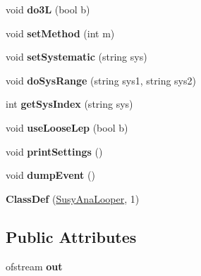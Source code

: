 \begin{DoxyCompactItemize}
\item 
\hypertarget{classSusyAnaLooper_ac052d906c31f6143c6c4a2cfec9c166d}{
void {\bfseries do3L} (bool b)}
\label{classSusyAnaLooper_ac052d906c31f6143c6c4a2cfec9c166d}

\item 
\hypertarget{classSusyAnaLooper_adb001d7df8be127ce626abb12f2d3735}{
void {\bfseries setMethod} (int m)}
\label{classSusyAnaLooper_adb001d7df8be127ce626abb12f2d3735}

\item 
\hypertarget{classSusyAnaLooper_aa65a103d4ad98c201fce242b612adba2}{
void {\bfseries setSystematic} (string sys)}
\label{classSusyAnaLooper_aa65a103d4ad98c201fce242b612adba2}

\item 
\hypertarget{classSusyAnaLooper_a2828279e51a904222ecfbcb9cfa51015}{
void {\bfseries doSysRange} (string sys1, string sys2)}
\label{classSusyAnaLooper_a2828279e51a904222ecfbcb9cfa51015}

\item 
\hypertarget{classSusyAnaLooper_a435f3dd21a498e30111946be71d75019}{
int {\bfseries getSysIndex} (string sys)}
\label{classSusyAnaLooper_a435f3dd21a498e30111946be71d75019}

\item 
\hypertarget{classSusyAnaLooper_aa1e947b5f0a2ac1022b81b5cfadfdc49}{
void {\bfseries useLooseLep} (bool b)}
\label{classSusyAnaLooper_aa1e947b5f0a2ac1022b81b5cfadfdc49}

\item 
\hypertarget{classSusyAnaLooper_affd68ac0284639f1234a94cc8fbc3b7f}{
void {\bfseries printSettings} ()}
\label{classSusyAnaLooper_affd68ac0284639f1234a94cc8fbc3b7f}

\item 
\hypertarget{classSusyAnaLooper_a5863f5b3dae4cebe1ae59a93775c437f}{
void {\bfseries dumpEvent} ()}
\label{classSusyAnaLooper_a5863f5b3dae4cebe1ae59a93775c437f}

\item 
\hypertarget{classSusyAnaLooper_a59c8f810dee28ff07a0028d3e068068b}{
{\bfseries ClassDef} (\hyperlink{classSusyAnaLooper}{SusyAnaLooper}, 1)}
\label{classSusyAnaLooper_a59c8f810dee28ff07a0028d3e068068b}

\end{DoxyCompactItemize}
\subsection*{Public Attributes}
\begin{DoxyCompactItemize}
\item 
\hypertarget{classSusyAnaLooper_a52c42bb8b5d505421099cb512bb32520}{
ofstream {\bfseries out}}
\label{classSusyAnaLooper_a52c42bb8b5d505421099cb512bb32520}

\end{DoxyCompactItemize}
